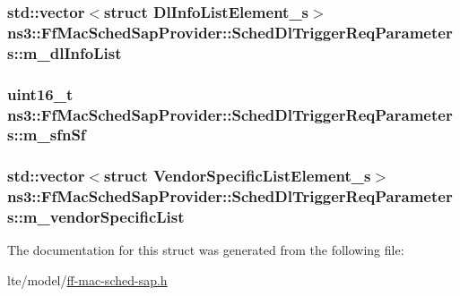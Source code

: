 \subsubsection[{\texorpdfstring{m\+\_\+dl\+Info\+List}{m_dlInfoList}}]{\setlength{\rightskip}{0pt plus 5cm}std\+::vector$<$struct {\bf Dl\+Info\+List\+Element\+\_\+s}$>$ ns3\+::\+Ff\+Mac\+Sched\+Sap\+Provider\+::\+Sched\+Dl\+Trigger\+Req\+Parameters\+::m\+\_\+dl\+Info\+List}\hypertarget{structns3_1_1FfMacSchedSapProvider_1_1SchedDlTriggerReqParameters_abe582862ee05e494899cfeb12787c2fc}{}\label{structns3_1_1FfMacSchedSapProvider_1_1SchedDlTriggerReqParameters_abe582862ee05e494899cfeb12787c2fc}
\subsubsection[{\texorpdfstring{m\+\_\+sfn\+Sf}{m_sfnSf}}]{\setlength{\rightskip}{0pt plus 5cm}uint16\+\_\+t ns3\+::\+Ff\+Mac\+Sched\+Sap\+Provider\+::\+Sched\+Dl\+Trigger\+Req\+Parameters\+::m\+\_\+sfn\+Sf}\hypertarget{structns3_1_1FfMacSchedSapProvider_1_1SchedDlTriggerReqParameters_a7689a56aa4563c5cc83b92f596ac43e8}{}\label{structns3_1_1FfMacSchedSapProvider_1_1SchedDlTriggerReqParameters_a7689a56aa4563c5cc83b92f596ac43e8}
\subsubsection[{\texorpdfstring{m\+\_\+vendor\+Specific\+List}{m_vendorSpecificList}}]{\setlength{\rightskip}{0pt plus 5cm}std\+::vector$<$struct {\bf Vendor\+Specific\+List\+Element\+\_\+s}$>$ ns3\+::\+Ff\+Mac\+Sched\+Sap\+Provider\+::\+Sched\+Dl\+Trigger\+Req\+Parameters\+::m\+\_\+vendor\+Specific\+List}\hypertarget{structns3_1_1FfMacSchedSapProvider_1_1SchedDlTriggerReqParameters_a28e7bea1b166abc79bc26a53fd2d05af}{}\label{structns3_1_1FfMacSchedSapProvider_1_1SchedDlTriggerReqParameters_a28e7bea1b166abc79bc26a53fd2d05af}


The documentation for this struct was generated from the following file\+:\begin{DoxyCompactItemize}
\item 
lte/model/\hyperlink{ff-mac-sched-sap_8h}{ff-\/mac-\/sched-\/sap.\+h}\end{DoxyCompactItemize}
